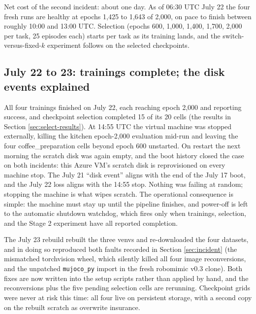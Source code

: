 \documentclass[11pt]{article}
\begin{document}
Net cost of the second incident: about one day. As of 06:30 UTC July 22 the
four fresh runs are healthy at epochs 1,425 to 1,643 of 2,000, on pace to
finish between roughly 10:00 and 13:00 UTC. Selection (epochs 600, 1,000,
1,400, 1,700, 2,000 per task, 25 episodes each) starts per task as its
training lands, and the switch-versus-fixed-$k$ experiment follows on the
selected checkpoints.

\subsection{July 22 to 23: trainings complete; the disk events explained}
\label{sec:incident3}

All four trainings finished on July 22, each reaching epoch 2,000 and
reporting success, and checkpoint selection completed 15 of its 20 cells
(the results in Section \ref{sec:select-results}). At 14:55 UTC the virtual
machine was stopped externally, killing the kitchen epoch-2,000 evaluation
mid-run and leaving the four coffee\_preparation cells beyond epoch 600
unstarted. On restart the next morning the scratch disk was again empty,
and the boot history closed the case on both incidents: this Azure VM's
scratch disk is reprovisioned on every machine stop. The July 21 ``disk
event'' aligns with the end of the July 17 boot, and the July 22 loss aligns
with the 14:55 stop. Nothing was failing at random; stopping the machine is
what wipes scratch. The operational consequence is simple: the machine must
stay up until the pipeline finishes, and power-off is left to the automatic
shutdown watchdog, which fires only when trainings, selection, and the
Stage 2 experiment have all reported completion.

The July 23 rebuild rebuilt the three venvs and re-downloaded the four
datasets, and in doing so reproduced both faults recorded in Section
\ref{sec:incident} (the mismatched torchvision wheel, which silently killed
all four image reconversions, and the unpatched \texttt{mujoco\_py} import in
the fresh robomimic v0.3 clone). Both fixes are now written into the setup
scripts rather than applied by hand, and the reconversions plus the five
pending selection cells are rerunning. Checkpoint grids were never at risk
this time: all four live on persistent storage, with a second copy on the
rebuilt scratch as overwrite insurance.
\label{sec:risks}
\end{document}
